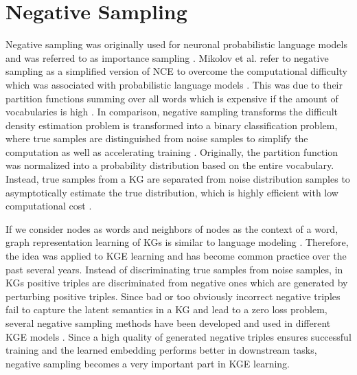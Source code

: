 \section{Negative Sampling}
\label{sec:negative_sampling}

Negative sampling was originally used for neuronal probabilistic language models and was referred to as importance sampling \cite{qiannegative, qianunderstanding}.
Mikolov et al. \cite{MikolovSCCD13} refer to negative sampling as a simplified version of \ac{NCE} to overcome the computational difficulty which was associated with probabilistic language models \cite{qianunderstanding}.
This was due to their partition functions summing over all words which is expensive if the amount of vocabularies is high \cite{qianunderstanding}.
In comparison, negative sampling transforms the difficult density estimation problem is transformed into a binary classification problem, where true samples are distinguished from noise samples to simplify the computation as well as accelerating training \cite{qianunderstanding}.
Originally, the partition function was normalized into a probability distribution based on the entire vocabulary.
Instead, true samples from a \ac{KG} are separated from noise distribution samples to asymptotically estimate the true distribution, which is highly efficient with low computational cost \cite{qianunderstanding}.

If we consider nodes as words and neighbors of nodes as the context of a word, graph representation learning of \acp{KG} is similar to language modeling \cite{qianunderstanding}.
Therefore, the idea was applied to \ac{KGE} learning and has become common practice over the past several years.
Instead of discriminating true samples from noise samples, in \acp{KG} positive triples are discriminated from negative ones which are generated by perturbing positive triples.
Since bad or too obviously incorrect negative triples fail to capture the latent semantics in a \ac{KG} and lead to a zero loss problem, several negative sampling methods have been developed and used in different \ac{KGE} models \cite{qiannegative}.
Since a high quality of generated negative triples ensures successful training and the learned embedding performs better in downstream tasks, negative sampling becomes a very important part in \ac{KGE} learning.


